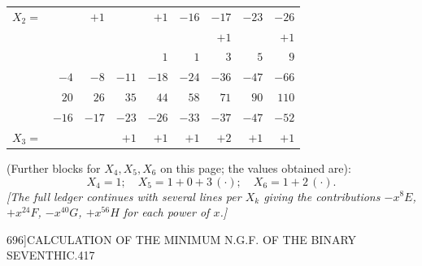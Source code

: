 \documentclass[11pt]{article}
\begin{document}
\begin{center}
\begin{tabular}{l|rrrrrrrr}
$X_{2}=$    &         & $+1$    &         & $+1$    & $-16$   & $-17$     & $-23$     & $-26$\\
            &         &         &         &         &         & $+1$      &           & $+1$ \\\hline
            &         &         &         & $1$     & $1$     & $3$       & $5$       & $9$  \\
            & $-4$    & $-8$    & $-11$   & $-18$   & $-24$   & $-36$     & $-47$     & $-66$\\
            & $20$    & $26$    & $35$    & $44$    & $58$    & $71$      & $90$      & $110$\\
            & $-16$   & $-17$   & $-23$   & $-26$   & $-33$   & $-37$     & $-47$     & $-52$\\
$X_{3}=$    &         &         & $+1$    & $+1$    & $+1$    & $+2$      & $+1$      & $+1$ \\\hline
\end{tabular}
\end{center}

\noindent (Further blocks for $X_{4}, X_{5}, X_{6}$ on this page; the values obtained are):
\[ X_{4}=1; \quad X_{5}= 1 + 0 + 3\,(\cdot); \quad X_{6} = 1 + 2\,(\cdot).\]
\textit{[The full ledger continues with several lines per $X_{k}$ giving the contributions $-x^{8}E$, $+x^{24}F$, $-x^{40}G$, $+x^{56}H$ for each power of $x$.]}

\clearpage
\begin{center}\small 696]\hfill CALCULATION OF THE MINIMUM N.G.F. OF THE BINARY SEVENTHIC.\hfill 417\end{center}
\end{document}
